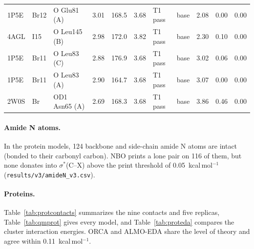 \documentclass[journal=jcisd8,manuscript=suppinfo]{achemso}
\begin{document}
\begin{singlespace}
\begin{table}[!htbp]
\begin{tabular}{lllrrrllrrr}
1P5E & Br12 & O Glu81 (A) & 3.01 & 168.5 & 3.68 & T1 pass & base & 2.08 & 0.00 & 0.00\\
4AGL & I15 & O Leu145 (B) & 2.98 & 172.0 & 3.82 & T1 pass & base & 2.30 & 0.10 & 0.00\\
1P5E & Br11 & O Leu83 (C) & 2.88 & 176.9 & 3.68 & T1 pass & base & 3.02 & 0.06 & 0.00\\
1P5E & Br11 & O Leu83 (A) & 2.90 & 164.7 & 3.68 & T1 pass & base & 3.07 & 0.00 & 0.00\\
2W0S & Br & OD1 Asn65 (A) & 2.69 & 168.3 & 3.68 & T1 pass & base & 3.86 & 0.46 & 0.00\\
\bottomrule\end{tabular}\end{table}

\paragraph{Amide N atoms.} In the protein models, 124 backbone and side-chain amide N atoms are intact (bonded to their carbonyl carbon). NBO prints a lone pair on 116 of them, but none donates into $\sigma^*$(C--X) above the print threshold of 0.05~kcal\,mol$^{-1}$ (\texttt{results/v3/amideN\_v3.csv}).

\paragraph{Proteins.} Table~\ref{tab:protcontacts} summarizes the nine contacts and five replicas, Table~\ref{tab:qmprot} gives every model, and Table~\ref{tab:proteda} compares the cluster interaction energies. ORCA and ALMO-EDA share the level of theory and agree within 0.11~kcal\,mol$^{-1}$.


\end{singlespace}
\end{document}
